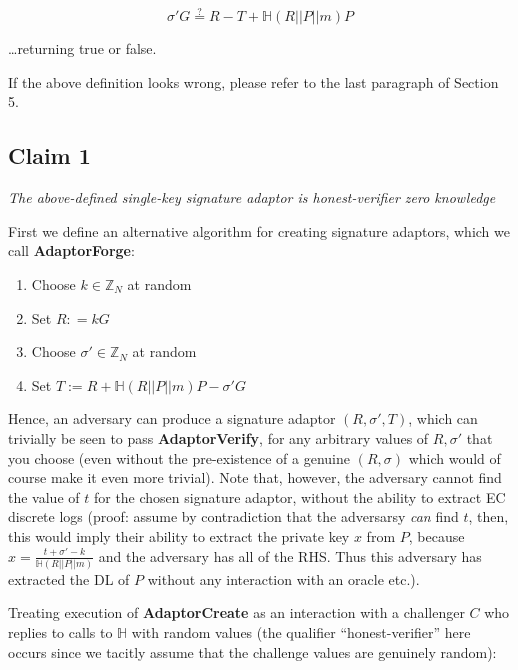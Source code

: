 \documentclass[10pt,a4paper]{article}
\begin{document}
$$ \sigma'G \stackrel{?}{=} R - T + \mathbb{H}(R||P||m)P$$

\ldots returning true or false.

\vspace{5 pt}

If the above definition looks wrong, please refer to the last paragraph of Section 5.

\subsection{Claim 1}

\emph{The above-defined single-key signature adaptor is honest-verifier zero knowledge}

\vspace{10 pt}

First we define an alternative algorithm for creating signature adaptors, which we call \textbf{AdaptorForge}:

\begin{enumerate}
\item Choose $k \in \mathbb{Z}_N$ at random
\item Set $R: = kG$
\item Choose $\sigma' \in \mathbb{Z}_N$ at random
\item Set $T := R + \mathbb{H}(R||P||m)P - \sigma' G$
\end{enumerate}

Hence, an adversary can produce a signature adaptor $(R, \sigma', T)$, which can trivially be seen to pass \textbf{AdaptorVerify}, for any arbitrary values of $R, \sigma'$ that you choose (even without the pre-existence of a genuine $(R, \sigma)$ which would of course make it even more trivial). Note that, however, the adversary cannot find the value of $t$ for the chosen signature adaptor, without the ability to extract EC discrete logs (proof: assume by contradiction that the adversarsy \emph{can} find $t$, then, this would imply their ability to extract the private key $x$ from $P$, because $x = \frac{t + \sigma' - k}{\mathbb{H}(R||P||m)}$ and the adversary has all of the RHS. Thus this adversary has extracted the DL of $P$ without any interaction with an oracle etc.).

\vspace{5 pt}

Treating execution of \textbf{AdaptorCreate} as an interaction with a challenger $C$ who replies to calls to $\mathbb{H}$ with random values (the qualifier ``honest-verifier'' here occurs since we tacitly assume that the challenge values are genuinely random):
\end{document}
